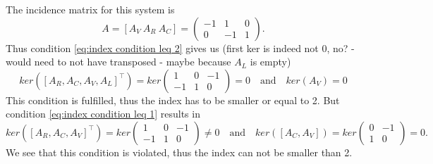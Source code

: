 	The incidence matrix for this system is
	\begin{displaymath}
		A = [A_V~A_R~A_C] = 
		\left(
		\begin{matrix}
			-1 & 1 & 0 \\
			0 & -1 & 1 
		\end{matrix}
		\right).
	\end{displaymath} 
	Thus condition \eqref{eq:index condition leq 2} gives us (first ker is indeed not 0, no? - would need to not have transposed - maybe because $A_L$ is empty)
	\begin{displaymath}
		ker([A_R, A_C, A_V, A_L]^\top) = ker
		\left(
		\begin{matrix}
			 1 & 0 & -1\\
			-1 & 1 & 0
		\end{matrix}
		\right) = 0 
		\quad \text{and} \quad 
		ker(A_V) = 0
	\end{displaymath}
	This condition is fulfilled, thus the index has to be smaller or equal to 2.
	But condition \eqref{eq:index condition leq 1} results in
	\begin{displaymath}
		ker([A_R, A_C, A_V]^\top) = ker\left(
		\begin{matrix}
			1 & 0 & -1\\
			-1 & 1 & 0
		\end{matrix}
		\right) \neq 0
		\quad \text{and} \quad
		ker([A_C, A_V]) = ker
		\left(
		\begin{matrix}
			0 & -1\\
			1 & 0
		\end{matrix}
		\right) = 0.
	\end{displaymath}
	We see that this condition is violated, thus the index can not be smaller than 2.
	
